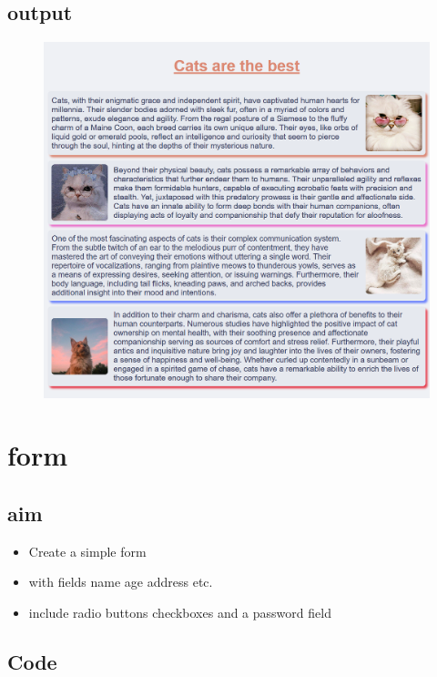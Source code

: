\documentclass{article}
\begin{document}
\subsection{output}
\begin{figure}[h!]
	\centering
	\includegraphics[width=1.0\textwidth]{./assets/p0301.png}
\end{figure}
\newpage

\section{form}
\subsection{aim}
\begin{itemize}
	\item Create a simple form
	\item with fields name age address etc.
	\item include radio buttons checkboxes and a password field
\end{itemize}

\subsection{Code}
\inputminted[frame=lines, linenos, breaklines, breakanywhere, numberblanklines=false]{html}{./prog_4/index.html}
\end{document}
